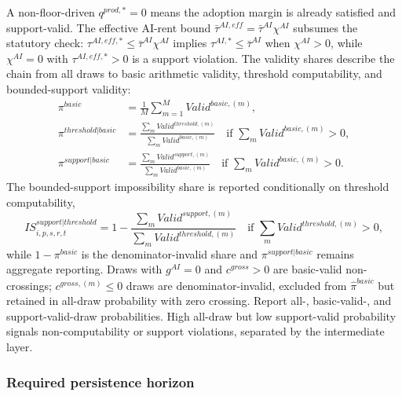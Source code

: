 \documentclass[11pt,a4paper]{article}
\begin{document}
A non-floor-driven $q^{prod,*}=0$ means the adoption margin is already satisfied and support-valid. The effective AI-rent bound $\bar\tau^{AI,eff}=\bar\tau^{AI}\chi^{AI}$ subsumes the statutory check: $\tau^{AI,eff,*}\leq\bar\tau^{AI}\chi^{AI}$ implies $\tau^{AI,*}\leq\bar\tau^{AI}$ when $\chi^{AI}>0$, while $\chi^{AI}=0$ with $\tau^{AI,eff,*}>0$ is a support violation.
The validity shares describe the chain from all draws to basic arithmetic validity, threshold computability, and bounded-support validity:
\begin{align}
    \pi^{basic}&=\frac{1}{M}\sum_{m=1}^{M}Valid^{basic,(m)},\\
    \pi^{threshold|basic}&=\frac{\sum_m Valid^{threshold,(m)}}{\sum_m Valid^{basic,(m)}}
    \quad\text{if }\sum_m Valid^{basic,(m)}>0,\\
    \pi^{support|basic}&=\frac{\sum_m Valid^{support,(m)}}{\sum_m Valid^{basic,(m)}}
    \quad\text{if }\sum_m Valid^{basic,(m)}>0.
\end{align}
The bounded-support impossibility share is reported conditionally on threshold computability,
\begin{equation}
    IS^{support|threshold}_{i,p,s,r,t}
    =1-\frac{\sum_m Valid^{support,(m)}}{\sum_m Valid^{threshold,(m)}}
    \quad\text{if }\sum_m Valid^{threshold,(m)}>0,
\end{equation}
while $1-\pi^{basic}$ is the denominator-invalid share and $\pi^{support|basic}$ remains aggregate reporting. Draws with $g^{AI}=0$ and $c^{gross}>0$ are basic-valid non-crossings; $c^{gross,(m)}\leq0$ draws are denominator-invalid, excluded from $\widehat{\pi}^{basic}$ but retained in all-draw probability with zero crossing. Report all-, basic-valid-, and support-valid-draw probabilities. High all-draw but low support-valid probability signals non-computability or support violations, separated by the intermediate layer.

\subsubsection{Required persistence horizon}\label{subsec:h_star_inversion}
\end{document}
